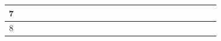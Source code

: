 \documentclass[
	12pt,				%
	openright,			%
	oneside,			%
	a4paper,			%
	brazil				%
	]{abntex2}
\begin{document}
\begin{table}[h]
\begin{tabular}{|c|cccccccccccc|cccccccccccc|}
		7                        & \multicolumn{1}{c|}{} & \multicolumn{1}{c|}{}                         & \multicolumn{1}{c|}{}                         & \multicolumn{1}{c|}{}                         & \multicolumn{1}{c|}{}                         & \multicolumn{1}{c|}{}                         & \multicolumn{1}{c|}{}                         & \multicolumn{1}{c|}{}                         & \multicolumn{1}{c|}{}                         & \multicolumn{1}{c|}{}                         & \multicolumn{1}{c|}{}                         &                          & \multicolumn{1}{c|}{}                         & \multicolumn{1}{c|}{}                         & \multicolumn{1}{c|}{}                         & \multicolumn{1}{c|}{}                         & \multicolumn{1}{c|}{}                         & \multicolumn{1}{c|}{}                         & \multicolumn{1}{c|}{\cellcolor[HTML]{343434}} & \multicolumn{1}{c|}{\cellcolor[HTML]{343434}} & \multicolumn{1}{c|}{\cellcolor[HTML]{343434}} & \multicolumn{1}{c|}{}                         & \multicolumn{1}{c|}{}                         &  \\ \hline
		8                        & \multicolumn{1}{c|}{} & \multicolumn{1}{c|}{}                         & \multicolumn{1}{c|}{}                         & \multicolumn{1}{c|}{}                         & \multicolumn{1}{c|}{}                         & \multicolumn{1}{c|}{}                         & \multicolumn{1}{c|}{}                         & \multicolumn{1}{c|}{}                         & \multicolumn{1}{c|}{}                         & \multicolumn{1}{c|}{}                         & \multicolumn{1}{c|}{}                         &                          & \multicolumn{1}{c|}{}                         & \multicolumn{1}{c|}{}                         & \multicolumn{1}{c|}{}                         & \multicolumn{1}{c|}{}                         & \multicolumn{1}{c|}{}                         & \multicolumn{1}{c|}{}                         & \multicolumn{1}{c|}{}                         & \multicolumn{1}{c|}{\cellcolor[HTML]{343434}} & \multicolumn{1}{c|}{\cellcolor[HTML]{343434}} & \multicolumn{1}{c|}{\cellcolor[HTML]{343434}} & \multicolumn{1}{c|}{}                         &  \\ \hline

\end{tabular}
\end{table}
\end{document}
